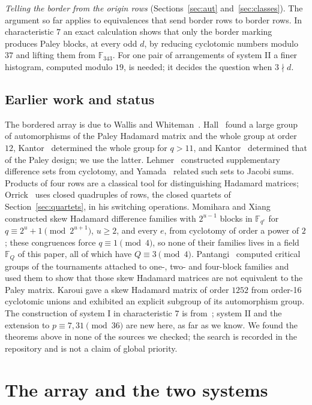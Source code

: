 \documentclass[11pt]{article}
\theoremstyle{plain}
\theoremstyle{definition}
\theoremstyle{remark}
\newcommand{\F}{\mathbb F}
\begin{document}
\emph{Telling the border from the origin rows} (Sections~\ref{sec:aut}
and~\ref{sec:classes}). The argument so far applies to equivalences that
send border rows to border rows. In characteristic $7$ an exact
calculation shows that only the border marking produces Paley blocks, at
every odd $d$, by reducing cyclotomic numbers modulo $37$ and lifting them
from $\F_{343}$. For one pair of arrangements of system II a finer
histogram, computed modulo $19$, is needed; it decides the question when
$3\nmid d$.

\subsection{Earlier work and status}
The bordered array is due to Wallis and Whiteman~\cite{WallisWhiteman}.
Hall~\cite{Hall62} found a large group of automorphisms of the Paley
Hadamard matrix and the whole group at order $12$, Kantor~\cite{Kantor69}
determined the whole group for $q>11$, and Kantor~\cite{Kantor2T} determined
that of the Paley design; we use the latter. Lehmer~\cite{Lehmer74} constructed
supplementary difference sets from cyclotomy, and Yamada~\cite{Yamada92}
related such sets to Jacobi sums. Products of four rows are a classical tool
for distinguishing Hadamard matrices; Orrick~\cite{Orrick} uses closed
quadruples of rows, the closed quartets of Section~\ref{sec:quartets}, in his
switching operations. Momihara and Xiang~\cite{MomiharaXiang} constructed
skew Hadamard difference families with $2^{u-1}$ blocks in $\F_{q^e}$ for
$q\equiv2^u+1\pmod{2^{u+1}}$, $u\ge2$, and every $e$, from cyclotomy of order
a power of $2$; these congruences force $q\equiv1\pmod4$, so none of their
families lives in a field $\F_Q$ of this paper, all of which have
$Q\equiv3\pmod4$. Pantangi~\cite{Pantangi}
computed critical groups of the tournaments attached to one-, two- and
four-block families and used them to show that those skew Hadamard matrices
are not equivalent to the Paley matrix. Karoui \cite{Karoui}
gave a skew Hadamard matrix of order $1252$ from order-16 cyclotomic unions
and exhibited an explicit subgroup of its automorphism group. The
construction of system I in characteristic $7$ is from~\cite{Kline18};
system II and the extension to $p\equiv7,31\pmod{36}$ are new here, as far as
we know. We found the theorems above in none of the sources we checked; the
search is recorded in the repository and is not a claim of global priority.

\section{The array and the two systems}\label{sec:array}
\end{document}
